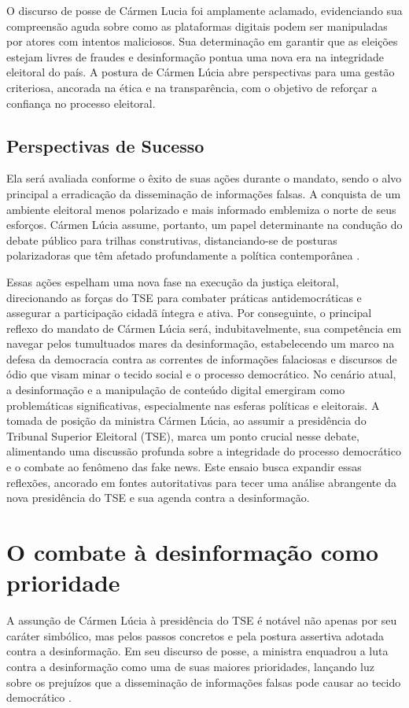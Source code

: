 \documentclass[
   article,       
   12pt,          
   oneside,       
   a4paper,       
   english,       
   brazil,        
   sumario=tradicional
   ]{abntex2}
\begin{document}
O discurso de posse de Cármen Lucia foi amplamente aclamado, evidenciando sua compreensão aguda sobre como as plataformas digitais podem ser manipuladas por atores com intentos maliciosos. Sua determinação em garantir que as eleições estejam livres de fraudes e desinformação pontua uma nova era na integridade eleitoral do país. A postura de Cármen Lúcia abre perspectivas para uma gestão criteriosa, ancorada na ética e na transparência, com o objetivo de reforçar a confiança no processo eleitoral.

\subsection{Perspectivas de Sucesso}
Ela será avaliada conforme o êxito de suas ações durante o mandato, sendo o alvo principal a erradicação da disseminação de informações falsas. A conquista de um ambiente eleitoral menos polarizado e mais informado emblemiza o norte de seus esforços. Cármen Lúcia assume, portanto, um papel determinante na condução do debate público para trilhas construtivas, distanciando-se de posturas polarizadoras que têm afetado profundamente a política contemporânea \cite{Carmen_Lucia_tem_de_afastar_TSE_da_polarizaca}.

Essas ações espelham uma nova fase na execução da justiça eleitoral, direcionando as forças do TSE para combater práticas antidemocráticas e assegurar a participação cidadã íntegra e ativa. Por conseguinte, o principal reflexo do mandato de Cármen Lúcia será, indubitavelmente, sua competência em navegar pelos tumultuados mares da desinformação, estabelecendo um marco na defesa da democracia contra as correntes de informações falaciosas e discursos de ódio que visam minar o tecido social e o processo democrático.
No cenário atual, a desinformação e a manipulação de conteúdo digital emergiram como problemáticas significativas, especialmente nas esferas políticas e eleitorais. A tomada de posição da ministra Cármen Lúcia, ao assumir a presidência do Tribunal Superior Eleitoral (TSE), marca um ponto crucial nesse debate, alimentando uma discussão profunda sobre a integridade do processo democrático e o combate ao fenômeno das fake news. Este ensaio busca expandir essas reflexões, ancorado em fontes autoritativas para tecer uma análise abrangente da nova presidência do TSE e sua agenda contra a desinformação.

\section{O combate à desinformação como prioridade}
A assunção de Cármen Lúcia à presidência do TSE é notável não apenas por seu caráter simbólico, mas pelos passos concretos e pela postura assertiva adotada contra a desinformação. Em seu discurso de posse, a ministra enquadrou a luta contra a desinformação como uma de suas maiores prioridades, lançando luz sobre os prejuízos que a disseminação de informações falsas pode causar ao tecido democrático \cite{Carmen_Lucia_toma_posse_na_presidencia_do_TSE}.
\end{document}
